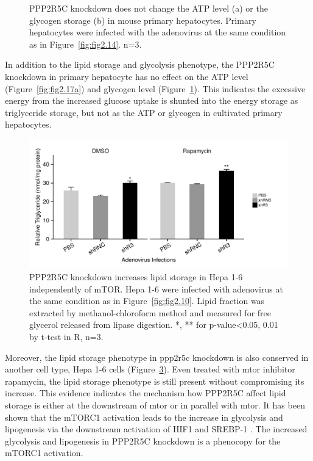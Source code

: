 \begin{figure}[htbp]
\begin{subfigure}[t]{0.48\textwidth}
    \label{fig:fig2.17b}
	\end{subfigure}
\caption[PPP2R5C KD has no effect on ATP and Glycogen in 1\textsuperscript{o} Hepatocytes]{\footnotesize PPP2R5C knockdown does not change the ATP level (a) or the glycogen storage (b) in mouse primary hepatocytes. Primary hepatocytes were infected with the adenovirus at the same condition as in Figure~\ref{fig:fig2.14}. n=3.}
\label{fig:fig2.17}
\end{figure}

In addition to the lipid storage and glycolysis phenotype, the PPP2R5C knockdown in primary hepatocyte has no effect on the \gls{ATP} level (Figure~\ref{fig:fig2.17a}) and glycogen level (Figure~\ref{fig:fig2.17b}). This indicates the excessive energy from the increased glucose uptake is shunted into the energy storage as triglyceride storage, but not as the \gls{ATP} or glycogen in cultivated primary hepatocytes. 

\begin{figure}[htbp]
\centering
\includegraphics[width=1\textwidth]{figs/fig2-18 hepa tag rapamycin.pdf}
\caption[Triglyceride increases in Hepa 1-6 upon PPP2R5C KD]{\footnotesize PPP2R5C knockdown increases lipid storage in Hepa 1-6 independently of mTOR. Hepa 1-6 were infected with adenovirus at the same condition as in Figure~\ref{fig:fig2.10}. Lipid fraction was extracted by methanol-chloroform method and measured for free glycerol released from lipase digestion.  *, ** for p-value<0.05, 0.01 by t-test in R, n=3.}
\label{fig:fig2.18}
\end{figure}

Moreover, the lipid storage phenotype in \gls{ppp2r5c} knockdown is also conserved in another cell type, Hepa 1-6 cells (Figure~\ref{fig:fig2.18}). Even treated with \gls{mtor} inhibitor rapamycin, the lipid storage phenotype is still present without compromising its increase. This evidence indicates the mechanism how PPP2R5C affect lipid storage is either at the downstream of \gls{mtor} or in parallel with \gls{mtor}. It has been shown that the mTORC1 activation leads to the increase in glycolysis and lipogenesis via the  downstream activation of HIF1\textalpha{} and SREBP-1 \cite{duvel_activation_2010}. The increased glycolysis and lipogenesis in PPP2R5C knockdown is a phenocopy for the mTORC1 activation. 

